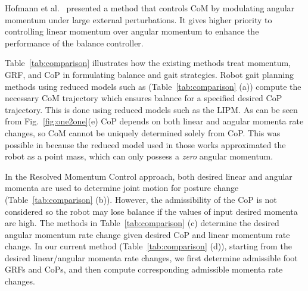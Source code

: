 \documentclass{llncs}
\begin{document}
Hofmann et al.~\cite{Hofmann09} presented a method that
controls CoM by modulating angular momentum under large
external perturbations. It gives higher priority to controlling
linear momentum over angular momentum to enhance the performance
of the balance controller.



Table~\ref{tab:comparison} illustrates how the existing methods treat momentum,
GRF, and CoP in formulating balance and gait strategies.
Robot gait planning methods using reduced models such
as \cite{KKKYH01,Choi07} (Table~\ref{tab:comparison} (a))
compute the necessary CoM trajectory which ensures balance
for a specified desired CoP trajectory.
This is done using reduced models such as the LIPM.
As can be seen from Fig.~\ref{fig:one2one}(e) CoP depends  on both
linear and angular momenta rate changes, so
CoM cannot be uniquely determined solely from CoP.
This was possible in \cite{KKKYH01,Choi07} because the reduced model used in those works
approximated the robot as a point mass, which
can only possess a {\it zero} angular momentum.

In the Resolved Momentum Control approach\cite{KKKFHYH03},
both desired linear and angular momenta are used to determine
joint motion for posture change (Table~\ref{tab:comparison} (b)).
However, the admissibility of the CoP is not considered so the
robot may lose balance if the values of input desired momenta are high.
The methods in Table~\ref{tab:comparison} (c) determine
the desired angular momentum rate change given desired CoP and linear momentum rate change.
In our current method (Table~\ref{tab:comparison} (d)), starting
from the desired linear/angular momenta rate changes, we first determine
admissible foot GRFs and CoPs, and then compute corresponding admissible
momenta rate changes.
\end{document}
